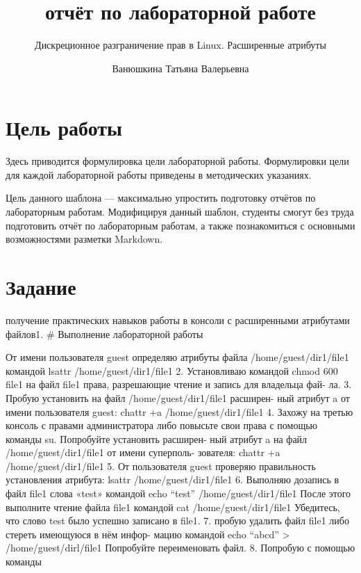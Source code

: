 \documentclass[
  12pt,
  a4paper,
  DIV=11,
  numbers=noendperiod]{scrreprt}
\title{отчёт по лабораторной работе}
\subtitle{Дискреционное разграничение прав в Linux. Расширенные
атрибуты}
\author{Ванюшкина Татьяна Валерьевна}
\date{}
\renewcommand*\contentsname{Содержание}
\newcommand\contentsname{Содержание}
\begin{document}
\maketitle

\renewcommand*\contentsname{Содержание}
{
\setcounter{tocdepth}{1}
\tableofcontents
}
\listoffigures
\listoftables

\chapter{Цель
работы}\label{ux446ux435ux43bux44c-ux440ux430ux431ux43eux442ux44b}

Здесь приводится формулировка цели лабораторной работы. Формулировки
цели для каждой лабораторной работы приведены в методических указаниях.

Цель данного шаблона --- максимально упростить подготовку отчётов по
лабораторным работам. Модифицируя данный шаблон, студенты смогут без
труда подготовить отчёт по лабораторным работам, а также познакомиться с
основными возможностями разметки Markdown.

\chapter{Задание}\label{ux437ux430ux434ux430ux43dux438ux435}

получение практических навыков работы в консоли с расширенными
атрибутами файлов1. \# Выполнение лабораторной работы

От имени пользователя guest определяю атрибуты файла
/home/guest/dir1/file1 командой lsattr /home/guest/dir1/file1 2.
Установливаю командой chmod 600 file1 на файл file1 права, разрешающие
чтение и запись для владельца фай- ла. 3. Пробую установить на файл
/home/guest/dir1/file1 расширен- ный атрибут a от имени пользователя
guest: chattr +a /home/guest/dir1/file1 4. Захожу на третью консоль с
правами администратора либо повысьте свои права с помощью команды su.
Попробуйте установить расширен- ный атрибут a на файл
/home/guest/dir1/file1 от имени суперполь- зователя: chattr +a
/home/guest/dir1/file1 5. От пользователя guest проверяю правильность
установления атрибута: lsattr /home/guest/dir1/file1 6. Выполняю
дозапись в файл file1 слова «test» командой echo \enquote{test}
/home/guest/dir1/file1 После этого выполните чтение файла file1 командой
cat /home/guest/dir1/file1 Убедитесь, что слово test было успешно
записано в file1. 7. пробую удалить файл file1 либо стереть имеющуюся в
нём инфор- мацию командой echo \enquote{abcd} \textgreater{}
/home/guest/dirl/file1 Попробуйте переименовать файл. 8. Попробую с
помощью команды
\end{document}
